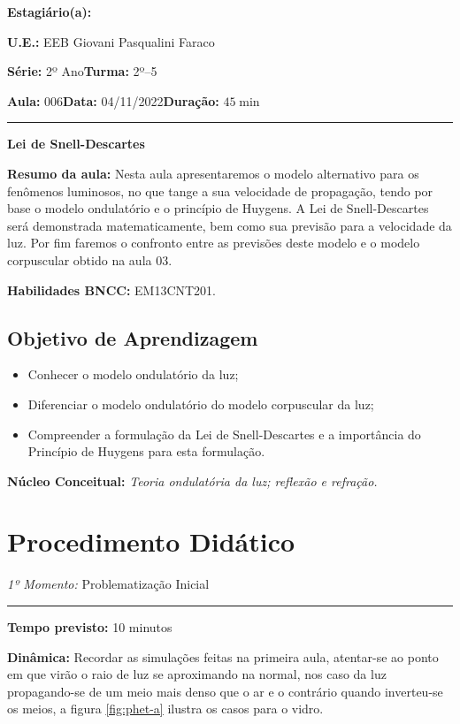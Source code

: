     \noindent \textbf{Estagiário(a): }\imprimirautor 
    
    \noindent \textbf{U.E.: }EEB Giovani Pasqualini Faraco
    
    \noindent \textbf{Série: }2º Ano\hfill{}\textbf{Turma: }2º--5
    
    \noindent \textbf{Aula:} 006\hfill{}\textbf{Data:} 04/11/2022\hfill{}\textbf{Duração:} $45\min$
    \rule{\textwidth}{.5pt}
    \bigskip{}  
    

    \noindent
    \begin{center}
      \textbf{Lei de Snell-Descartes}
    \par\end{center}
    \vspace{20pt}
    \noindent \textbf{Resumo da aula:} Nesta aula apresentaremos o modelo alternativo para os fenômenos luminosos, no que tange a sua velocidade de propagação, tendo por base o modelo ondulatório e o princípio de Huygens. A Lei de Snell-Descartes será demonstrada matematicamente, bem como sua previsão para a velocidade da luz. Por fim faremos o confronto entre as previsões deste modelo e o modelo corpuscular obtido na aula 03.
    \smallskip
    \par\noindent \textbf{Habilidades BNCC:} EM13CNT201.
    \medskip
    \subsection*{Objetivo de Aprendizagem}
    \begin{itemize}
        \item Conhecer o modelo ondulatório da luz;
        \item Diferenciar o modelo ondulatório do modelo corpuscular da luz;
        \item Compreender a formulação da Lei de Snell-Descartes e a importância do Princípio de Huygens para esta formulação.
    \end{itemize}    
    \bigskip{}    
    \noindent \textbf{Núcleo Conceitual:} \emph{Teoria ondulatória da luz; reflexão e refração.}
    \newpage
    

    \section*{Procedimento Didático} 
    \noindent\emph{1º Momento:} Problematização Inicial
    \par\noindent\rule{.3\textwidth}{.5pt}  
    \par\noindent\textbf{Tempo previsto:} 10 minutos
    \smallskip
    \par\noindent\textbf{Dinâmica:} Recordar as simulações feitas na primeira aula, atentar-se ao ponto em que virão o raio de luz se aproximando na normal, nos caso da luz propagando-se de um meio mais denso que o ar e o contrário quando inverteu-se os meios, a figura \autoref{fig:phet-a} ilustra os casos para o vidro.
    
